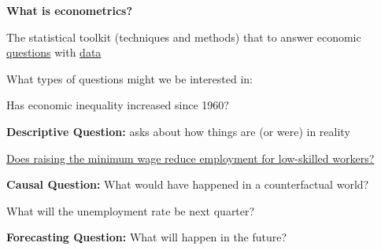 \documentclass[11pt, aspectratio=169]{beamer}
\newenvironment{wideitemize}{\itemize\addtolength{\itemsep}{5pt}}{\enditemize}
\begin{document}
\begin{frame}{\bf \large What is econometrics?}
	
	\vspace{0.2cm}
	The statistical toolkit (techniques and methods) that to answer economic \underline{questions} with \underline{data}
	\bigskip 
	
	\pause
	What types of questions might we be interested in: 
	\medskip
	
	\begin{wideitemize}
		\item<1-> Has economic inequality increased since 1960?
		\begin{wideitemize}
			\item<3-> \textbf{Descriptive Question:} asks about how things are (or were) in reality
		\end{wideitemize}
		\item<1-> \href{http://davidcard.berkeley.edu/papers/njmin-aer.pdf}{Does raising the minimum wage reduce employment for low-skilled workers?}
		\begin{wideitemize}
			\item<4-> \textbf{Causal Question:} What would have happened in a counterfactual world?  
		\end{wideitemize}
		\item<1->   What will the unemployment rate be next quarter?
		\begin{wideitemize}
			\item<5-> \textbf{Forecasting Question:} What will happen in the future?  
		\end{wideitemize}

	\end{wideitemize}
	
\end{frame}
\end{document}
